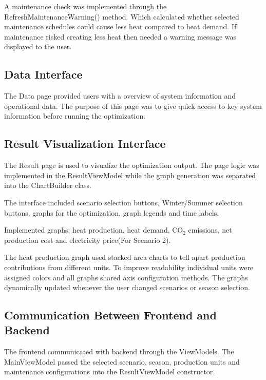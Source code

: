  A maintenance check was implemented through the RefreshMaintenanceWarning() method.
Which calculated whether selected maintenance schedules could cause less heat compared to heat demand.
If maintenance risked creating less heat then needed a warning message was displayed to the user.  


\subsection{Data Interface}

The Data page provided users with a overview of system information and operational data. The purpose of this page was to give quick access to key system information before running the optimization.



\subsection{Result Visualization Interface}

The Result page is used to visualize the optimization output.
The page logic was implemented in the ResultViewModel while the graph generation was separated into the ChartBuilder class.

The interface included scenario selection buttons, Winter/Summer selection buttons, graphs for the optimization, graph legends and time labels.

Implemented graphs: heat production, heat demand, CO$_2$ emissions, net production cost and electricity price(For Scenario 2).

The heat production graph used stacked area charts to tell apart production contributions from different units.  
To improve readability individual units were assigned colors and all graphs shared axis configuration methods.  
The graphs dynamically updated whenever the user changed scenarios or season selection.





\subsection{Communication Between Frontend and Backend}

The frontend communicated with backend through the ViewModels. 
The MainViewModel passed the selected scenario,  season, production units and maintenance configurations into the ResultViewModel constructor.





